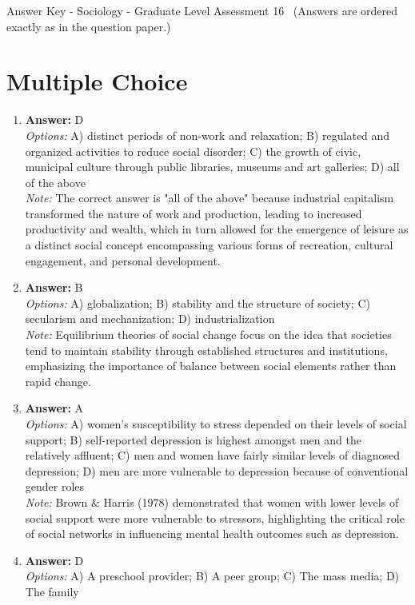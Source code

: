 \documentclass[12pt]{article}
\begin{document}
\begin{center}
Answer Key - Sociology - Graduate Level Assessment 16 \
\small (Answers are ordered exactly as in the question paper.)
\end{center}

\section*{Multiple Choice}
\begin{enumerate}[label=\arabic*.]
\item \textbf{Answer:} D
\\ \textit{Options:} A) distinct periods of non-work and relaxation; B) regulated and organized activities to reduce social disorder; C) the growth of civic, municipal culture through public libraries, museums and art galleries; D) all of the above
\\ \textit{Note:} The correct answer is "all of the above" because industrial capitalism transformed the nature of work and production, leading to increased productivity and wealth, which in turn allowed for the emergence of leisure as a distinct social concept encompassing various forms of recreation, cultural engagement, and personal development.
\item \textbf{Answer:} B
\\ \textit{Options:} A) globalization; B) stability and the structure of society; C) secularism and mechanization; D) industrialization
\\ \textit{Note:} Equilibrium theories of social change focus on the idea that societies tend to maintain stability through established structures and institutions, emphasizing the importance of balance between social elements rather than rapid change.
\item \textbf{Answer:} A
\\ \textit{Options:} A) women's susceptibility to stress depended on their levels of social support; B) self-reported depression is highest amongst men and the relatively affluent; C) men and women have fairly similar levels of diagnosed depression; D) men are more vulnerable to depression because of conventional gender roles
\\ \textit{Note:} Brown \& Harris (1978) demonstrated that women with lower levels of social support were more vulnerable to stressors, highlighting the critical role of social networks in influencing mental health outcomes such as depression.
\item \textbf{Answer:} D
\\ \textit{Options:} A) A preschool provider; B) A peer group; C) The mass media; D) The family

\end{enumerate}
\end{document}
